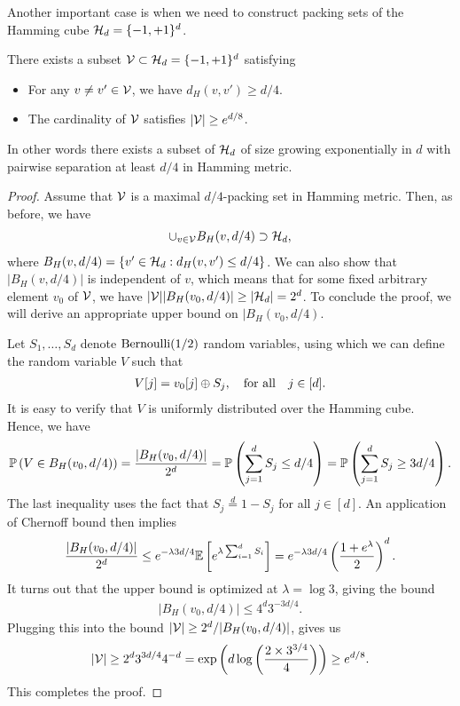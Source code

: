 \documentclass[12pt]{article}
\begin{document}
Another important case is when we need to construct packing sets of the Hamming cube ${\cal H}_d = \{-1, +1\}^d$. 
\begin{lemma}
	\label{lemma:gilbert-varshamov} There exists a subset ${\cal V} \subset {\cal H}_d = \{-1, +1\}^d$ satisfying 
	\begin{itemize}
		\item For any $v \neq v' \in {\cal V}$, we have $d_H(v, v') \geq d/4$.
		\item The cardinality of ${\cal V}$ satisfies $|{\cal V}| \geq e^{d/8}$. 
	\end{itemize}
	In other words there exists a subset of ${\cal H}_d$ of  size growing exponentially in $d$ with pairwise separation at least $d/4$ in Hamming metric. 
\end{lemma}

\begin{proof}
Assume that ${\cal V}$ is a maximal $d/4$-packing set in Hamming metric. Then, as before, we have 
\begin{align}
	\cup_{v \in {\cal V}} B_H(v, d/4) \supset {\cal H}_d, 
\end{align}	
where $B_H(v, d/4) = \{v' \in {\cal H}_d: d_H(v, v') \leq d/4\}$. We can also show that $|B_H(v, d/4)|$ is independent of $v$, which means that for some fixed arbitrary element $v_0$ of ${\cal V}$, we have $|{\cal V}| |B_H(v_0, d/4)| \geq |{\cal H}_d| = 2^d$. To conclude the proof, we will derive an appropriate upper bound on $|B_H(v_0, d/4)$. 

Let $S_1, \ldots, S_d$ denote \iid $\mathrm{Bernoulli}(1/2)$ random variables, using which we can define the random variable $V$ such that 
\begin{align}
	V[j] = v_0[j] \oplus S_j, \quad \text{for all} \quad j \in [d]. 
\end{align}
It is easy to verify that $V$ is uniformly distributed over the Hamming cube. Hence, we have 
\begin{align}
	\mathbb{P}\left( V \in B_H(v_0, d/4) \right)  = \frac{|B_H(v_0, d/4)|}{2^d} = \mathbb{P}\left( \sum_{j=1}^d S_j \leq d/4 \right)= \mathbb{P}\left( \sum_{j=1}^d S_j \geq 3d/4 \right). 
\end{align}
The last inequality uses the fact that $S_j \stackrel{d}{=} 1-S_j$ for all $j \in [d]$. An application of Chernoff bound then implies  
\begin{align}
	 \frac{|B_H(v_0, d/4)|}{2^d}  \leq e^{-\lambda 3d/4} \mathbb{E}\left[ e^{\lambda \sum_{i=1}^d S_i} \right] = e^{-\lambda 3d/4} \left( \frac{1 + e^\lambda}{2} \right)^d. 
\end{align}
It turns out that the upper bound is optimized at $\lambda=\log 3$, giving the bound 
\begin{align}
	|B_H(v_0, d/4)| \leq 4^d 3^{-3d/4}. 
\end{align}
Plugging this into the bound $|{\cal V}| \geq 2^d / |B_H(v_0, d/4)|$, gives us 
\begin{align}
	|{\cal V}| \geq 2^d 3^{3d/4} 4^{-d} = \exp \left( d \log \left( \frac{2 \times 3^{3/4}}{4} \right)\right) \geq e^{d/8}. 
\end{align}
This completes the proof. 
\end{proof}
\end{document}
